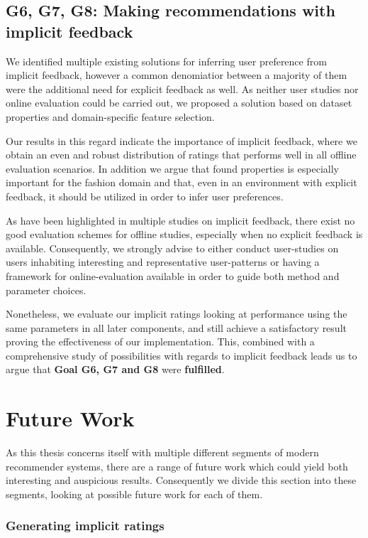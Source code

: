 \subsection{G6, G7, G8: Making recommendations with implicit feedback}
\label{sec:implicit-discussion}

We identified multiple existing solutions for inferring user preference from
implicit feedback, however a common denomiatior between a majority of them were
the additional need for explicit feedback as well. As neither user studies nor
online evaluation could be carried out, we proposed a solution based on dataset
properties and domain-specific feature selection.

Our results in this regard indicate the importance of implicit feedback, where
we obtain an even and robust distribution of ratings that performs well in all
offline evaluation scenarios. In addition we argue that found properties is
especially important for the fashion domain and that, even in an environment
with explicit feedback, it should be utilized in order to infer user
preferences.

As have been highlighted in multiple studies on implicit feedback, there exist
no good evaluation schemes for offline studies, especially when no explicit
feedback is available. Consequently, we strongly advise to either conduct
user-studies on users inhabiting interesting and representative user-patterns
or having a framework for online-evaluation available in order to guide both
method and parameter choices.

Nonetheless, we evaluate our implicit ratings looking at performance using the
same parameters in all later components, and still achieve a satisfactory
result proving the effectiveness of our implementation. This, combined with a
comprehensive study of possibilities with regards to implicit feedback leads us
to argue that \textbf{Goal G6, G7 and G8} were \textbf{fulfilled}.

\section{Future Work}

As this thesis concerns itself with multiple different segments of modern
recommender systems, there are a range of future work which could yield
both interesting and auspicious results. Consequently we divide this section
into these segments, looking at possible future work for each of them.

\subsubsection{Generating implicit ratings}

